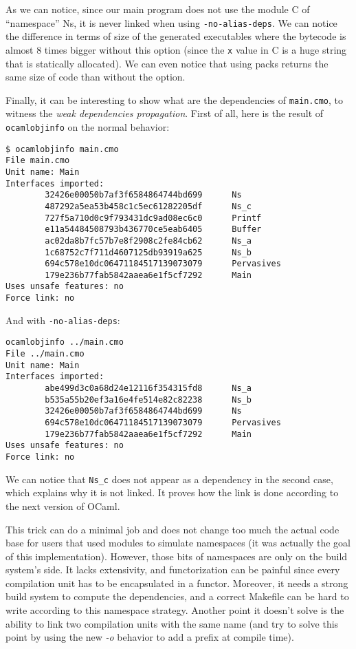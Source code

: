\documentclass[11pt,a4paper]{article}
\begin{document}
As we can notice, since our main program does not use the module C of
``namespace'' Ns, it is never linked when using \texttt{-no-alias-deps}. We can
notice the difference in terms of size of the generated executables where the
bytecode is almost 8 times bigger without this option (since the \texttt{x}
value in C is a huge string that is statically allocated). We can even notice
that using packs returns the same size of code than without the option.

Finally, it can be interesting to show what are the dependencies of
\texttt{main.cmo}, to witness the \emph{weak dependencies propagation}. First of
all, here is the result of \texttt{ocamlobjinfo} on the normal behavior:

\begin{verbatim}
$ ocamlobjinfo main.cmo
File main.cmo
Unit name: Main
Interfaces imported:
        32426e00050b7af3f6584864744bd699      Ns
        487292a5ea53b458c1c5ec61282205df      Ns_c
        727f5a710d0c9f793431dc9ad08ec6c0      Printf
        e11a54484508793b436770ce5eab6405      Buffer
        ac02da8b7fc57b7e8f2908c2fe84cb62      Ns_a
        1c68752c7f711d4607125db93919a625      Ns_b
        694c578e10dc06471184517139073079      Pervasives
        179e236b77fab5842aaea6e1f5cf7292      Main
Uses unsafe features: no
Force link: no
\end{verbatim}

And with \texttt{-no-alias-deps}:

\begin{verbatim}
ocamlobjinfo ../main.cmo
File ../main.cmo
Unit name: Main
Interfaces imported:
        abe499d3c0a68d24e12116f354315fd8      Ns_a
        b535a55b20ef3a16e4fe514e82c82238      Ns_b
        32426e00050b7af3f6584864744bd699      Ns
        694c578e10dc06471184517139073079      Pervasives
        179e236b77fab5842aaea6e1f5cf7292      Main
Uses unsafe features: no
Force link: no
\end{verbatim}

We can notice that \texttt{Ns\_c} does not appear as a dependency in the second
case, which explains why it is not linked. It proves how the link is done
according to the next version of OCaml.

This trick can do a minimal job and does not change too much the actual code
base for users that used modules to simulate namespaces (it was actually the
goal of this implementation). However, those bits of namespaces are only on the
build system's side. It lacks extensivity, and functorization can be painful
since every compilation unit has to be encapsulated in a functor. Moreover, it
needs a strong build system to compute the dependencies, and a correct Makefile
can be hard to write according to this namespace strategy. Another point it
doesn't solve is the ability to link two compilation units with the same name
(and try to solve this point by using the new \emph{-o} behavior to add a prefix
at compile time).
\end{document}
